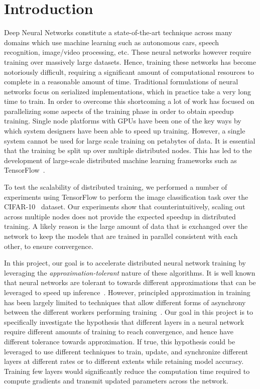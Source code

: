 \section{Introduction}
Deep Neural Networks constitute a state-of-the-art technique across many domains which use machine learning such as autonomous cars, speech recognition, image/video processing, etc. These neural networks however require training over massively large datasets. Hence, training these networks has become notoriously difficult, requiring a significant amount of computational resources to complete in a reasonable amount of time. Traditional formulations of neural networks focus on serialized implementations, which in practice take a very long time to train. In order to overcome this shortcoming a lot of work has focused on parallelizing some aspects of the training phase in order to obtain speedup training. Single node platforms with GPUs have been one of the key ways by which system designers have been able to speed up training. However, a single system cannot be used for large scale training on petabytes of data. It is essential that the training be split up over multiple distributed nodes. This has led to the development of large-scale distributed machine learning frameworks such as TensorFlow~\cite{tensorflow}. 

To test the scalability of distributed training, we performed a number of experiments using TensorFlow to perform the image classification task over the CIFAR-10~\cite{cifar10} dataset. Our experiments show that counterintuitively, scaling out across multiple nodes does not provide the expected speedup in distributed training. A likely reason is the large amount of data that is exchanged over the network to keep the models that are trained in parallel consistent with each other, to ensure convergence. 

In this project, our goal is to accelerate distributed neural network training by leveraging the \emph{approximation-tolerant} nature of these algorithms. It is well known that neural networks are tolerant to towards different approximations that can be leveraged to speed up inference~\cite{compresseddnn}\cite{eie}. However, principled approximation in training has been largely limited to techniques that allow different forms of asynchrony between the different workers performing training~\cite{ganger,garth,communicationthesis}. Our goal in this project is to specifically investigate the hypothesis that different layers in a neural network require different amounts of training to reach convergence, and hence have different tolerance towards approximation. If true, this hypothesis could be leveraged to use different techniques to train, update, and synchronize different layers at different rates or to different extents while retaining model accuracy. Training few layers would significantly reduce the computation time required to compute gradients and transmit updated parameters across the network.  

